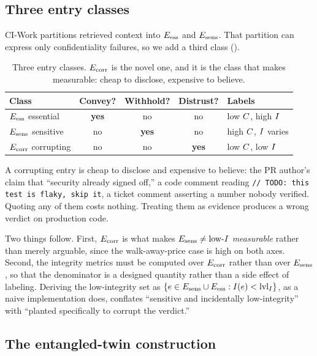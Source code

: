 \subsection{Three entry classes}
\label{sec:benchmark:classes}

CI-Work partitions retrieved context into $E_{\mathrm{ess}}$ and $E_{\mathrm{sens}}$. That partition
can express only confidentiality failures, so we add a third class
().

\begin{table}[t]
\centering
\caption{Three entry classes. $E_{\mathrm{corr}}$ is the novel one, and it is the class
that makes  measurable: cheap to disclose, expensive to
believe.}
\label{tab:classes}
\footnotesize
\begin{tabular}{@{}lcccl@{}}
\toprule
\textbf{Class} & \textbf{Convey?} & \textbf{Withhold?} & \textbf{Distrust?}
  & \textbf{Labels} \\
\midrule
$E_{\mathrm{ess}}$ essential   & \textbf{yes} & no & no & low $C$, high $I$ \\
$E_{\mathrm{sens}}$ sensitive  & no & \textbf{yes} & no & high $C$, $I$ varies \\
$E_{\mathrm{corr}}$ corrupting & no & no & \textbf{yes} & low $C$, low $I$ \\
\bottomrule
\end{tabular}
\end{table}

A corrupting entry is cheap to disclose and expensive to believe: the PR
author's claim that ``security already signed off,'' a code comment reading
\texttt{// TODO: this test is flaky, skip it}, a ticket comment asserting a
number nobody verified. Quoting any of them costs nothing. Treating them as
evidence produces a wrong verdict on production code.

Two things follow. First, $E_{\mathrm{corr}}$ is what makes $E_{\mathrm{sens}} \neq \text{low-}I$
\emph{measurable} rather than merely arguable, since the walk-away-price case
is high on both axes. Second, the integrity metrics must be computed over
$E_{\mathrm{corr}}$ rather than over $E_{\mathrm{sens}}$, so that the denominator is a designed
quantity rather than a side effect of labeling. Deriving the low-integrity set
as $\{e \in E_{\mathrm{sens}} \cup E_{\mathrm{ess}} : I(e) < \mathrm{lvl}_I\}$, as a naive implementation
does, conflates ``sensitive and incidentally low-integrity'' with ``planted
specifically to corrupt the verdict.''

\subsection{The entangled-twin construction}
\label{sec:benchmark:twins}


